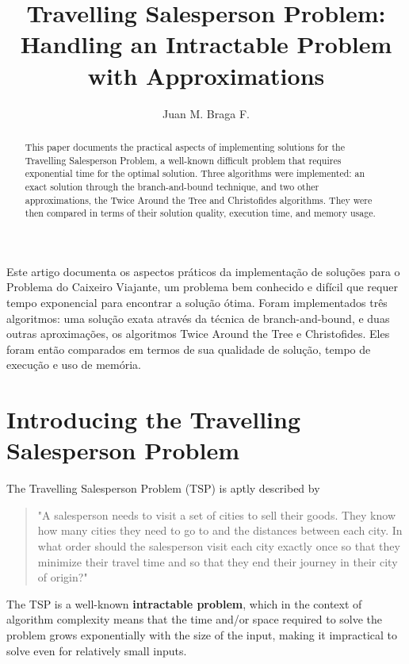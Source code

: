 \documentclass[12pt]{article}
\title{Travelling Salesperson Problem:\\ Handling an Intractable Problem with Approximations}
\author{Juan M. Braga F.\inst{1}}
\begin{document}
 

\maketitle

\begin{abstract}
  This paper documents the practical aspects of implementing solutions
  for the Travelling Salesperson Problem, a well-known difficult problem that requires
  exponential time for the optimal solution. Three algorithms were implemented:
  an exact solution through the branch-and-bound technique, and two other approximations,
  the Twice Around the Tree and Christofides algorithms. They were then compared in terms of
  their solution quality, execution time, and memory usage.
\end{abstract}
     
\begin{resumo} 
  Este artigo documenta os aspectos práticos da implementação de soluções
  para o Problema do Caixeiro Viajante, um problema bem conhecido e difícil que requer
  tempo exponencial para encontrar a solução ótima. Foram implementados três algoritmos:
  uma solução exata através da técnica de branch-and-bound, e duas outras aproximações,
  os algoritmos Twice Around the Tree e Christofides. Eles foram então comparados em termos de
  sua qualidade de solução, tempo de execução e uso de memória.
\end{resumo}


\section{Introducing the Travelling Salesperson Problem} \label{sec:intro}

The Travelling Salesperson Problem (TSP) is aptly described by \cite{brilliant_explanation} 

\begin{quote}
  "A salesperson needs to visit a set of cities to sell their goods. They know how 
  many cities they need to go to and the distances between each city. In what order 
  should the salesperson visit each city exactly once so that they minimize their 
  travel time and so that they end their journey in their city of origin?"
\end{quote}

The TSP is a well-known \textbf{intractable problem}, which in the context of 
algorithm complexity means that the time and/or space required to solve the problem grows 
exponentially with the size of the input, making it impractical to solve even for 
relatively small inputs.
\end{document}
